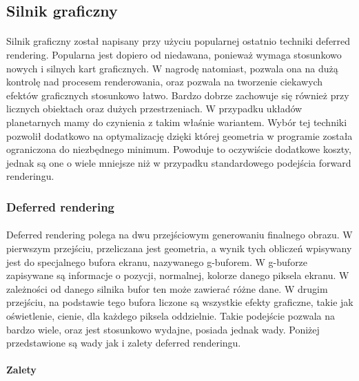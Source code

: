 \subsection{Silnik graficzny}\label{sub:silnik graficzny}
\paragraph{}

Silnik graficzny został napisany przy użyciu popularnej ostatnio techniki deferred rendering. Popularna jest dopiero od niedawana, ponieważ wymaga stosunkowo nowych i silnych kart graficznych. W nagrodę natomiast, pozwala ona na dużą kontrolę nad procesem renderowania, oraz pozwala na tworzenie ciekawych efektów graficznych stosunkowo łatwo. Bardzo dobrze zachowuje się również przy licznych obiektach oraz dużych przestrzeniach. W przypadku układów planetarnych mamy do czynienia z takim właśnie wariantem. Wybór tej techniki pozwolił dodatkowo na optymalizację dzięki której geometria w programie została ograniczona do niezbędnego minimum. Powoduje to oczywiście dodatkowe koszty, jednak są one o wiele mniejsze niż w przypadku standardowego podejścia forward renderingu.

\subsubsection{Deferred rendering}\label{ssub:deferred rendering}
\paragraph{}

Deferred rendering polega na dwu przejściowym generowaniu finalnego obrazu. W pierwszym przejściu, przeliczana jest geometria, a wynik tych obliczeń wpisywany jest do specjalnego bufora ekranu, nazywanego g-buforem. W g-buforze zapisywane są informacje o pozycji, normalnej, kolorze danego piksela ekranu. W zależności od danego silnika bufor ten może zawierać różne dane. W drugim przejściu, na podstawie tego bufora liczone są wszystkie efekty graficzne, takie jak oświetlenie, cienie, dla każdego piksela oddzielnie. Takie podejście pozwala na bardzo wiele, oraz jest stosunkowo wydajne, posiada jednak wady. Poniżej przedstawione są wady jak i zalety deferred renderingu.

\paragraph{Zalety}

